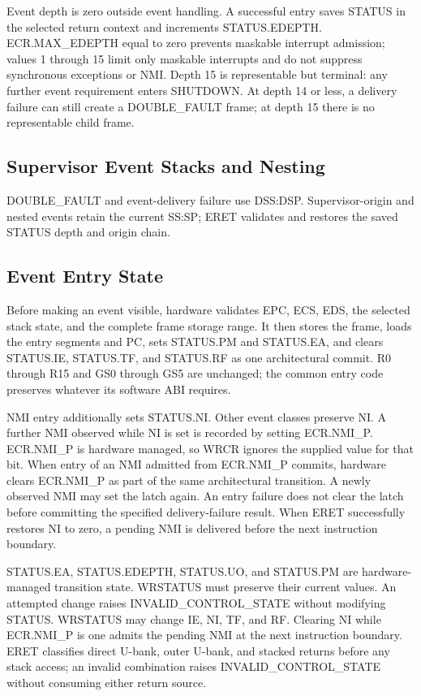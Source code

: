 Event depth is zero outside event handling. A successful entry saves STATUS in the selected return context and
increments STATUS.EDEPTH. ECR.MAX\_EDEPTH equal to zero prevents maskable interrupt admission; values 1 through 15 limit
only maskable interrupts and do not suppress synchronous exceptions or NMI. Depth 15 is representable but terminal:
any further event requirement enters SHUTDOWN. At depth 14 or less, a delivery failure can still create a
DOUBLE\_FAULT frame; at depth 15 there is no representable child frame.

\subsection{Supervisor Event Stacks and Nesting}


DOUBLE\_FAULT and event-delivery failure use DSS:DSP. Supervisor-origin and nested events retain the current SS:SP;
ERET validates and restores the saved STATUS depth and origin chain.

\subsection{Event Entry State}
Before making an event visible, hardware validates EPC, ECS, EDS, the selected stack state, and the complete frame
storage range. It then stores the frame, loads the entry segments and PC, sets STATUS.PM and STATUS.EA, and clears
STATUS.IE, STATUS.TF, and STATUS.RF as one architectural commit. R0 through R15 and GS0 through GS5 are unchanged;
the common entry code preserves whatever its software ABI requires.

NMI entry additionally sets STATUS.NI. Other event classes preserve NI. A further NMI observed while NI is set is
recorded by setting ECR.NMI\_P. ECR.NMI\_P is hardware managed, so WRCR ignores the supplied value for that bit.
When entry of an NMI admitted from ECR.NMI\_P commits, hardware clears ECR.NMI\_P as part of the same architectural
transition. A newly observed NMI may set the latch again. An entry failure does not clear the latch before committing
the specified delivery-failure result. When ERET successfully restores NI to zero, a pending NMI is delivered before
the next instruction boundary.

STATUS.EA, STATUS.EDEPTH, STATUS.UO, and STATUS.PM are hardware-managed transition state. WRSTATUS must preserve
their current values. An attempted change raises INVALID\_CONTROL\_STATE without modifying STATUS. WRSTATUS may
change IE, NI, TF, and RF. Clearing NI while ECR.NMI\_P is one admits the pending NMI at the next instruction
boundary. ERET classifies direct U-bank, outer U-bank, and stacked returns before any stack access; an invalid
combination raises INVALID\_CONTROL\_STATE without consuming either return source.

